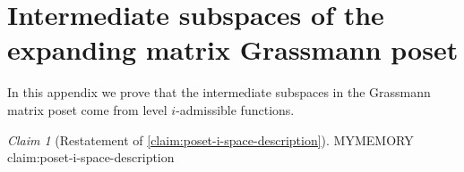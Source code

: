 \documentclass[10pt,a4paper]{article}
\newcommand{\prettyref}[1]{\cref{#1}}
\newtheorem{lemma}[theorem]{Lemma}
\theoremstyle{definition}
\theoremstyle{remark}
\newtheorem*{claim*}{Claim}
\newcommand{\Authornotecolored}[3]{{\sffamily\small\color{#1}{[#2: #3]}}}
\newcommand{\Authornotecolored}[3]{}
\newcommand{\Ynote}{\Authornotecolored{Purple}{Y}}
\newcommand{\set}[1]{\{#1\}}
\numberwithin{equation}{section}
\newcommand{\MYload}[1]{%
  \csname MYMEMORY #1 \endcsname%
}
\newcommand{\MYdummylabel}[1]{}
\newcommand{\restateclaim}[1]{%
  \let\MYoldlabel\label
  \let\label\MYdummylabel
  \begin{claim*}[Restatement of \prettyref{#1}]
    \MYload{#1}
  \end{claim*}
  \let\label\MYoldlabel
}
\newcommand{\boundary}{\partial}
\begin{document}

\section{Intermediate subspaces of the expanding matrix Grassmann poset} \label{app:admissible-functions-structure-proof}
In this appendix we prove that the intermediate subspaces in the Grassmann matrix poset come from level \(i\)-admissible functions.
\restateclaim{claim:poset-i-space-description}
\end{document}
